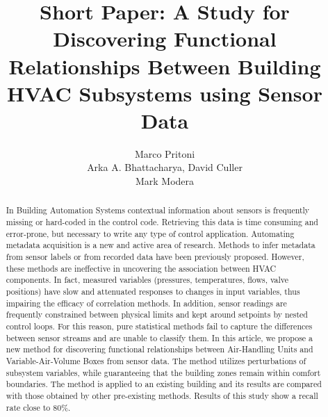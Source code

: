 \documentclass{sig-alternate-2013}
\author{
	Marco Pritoni\\
      \affaddr{UC Davis}
 \alignauthor
 Arka A. Bhattacharya, David Culler \\
 \affaddr{UC Berkeley} 
\alignauthor
  Mark Modera\\
 \affaddr{UC Davis}
}
\title{Short Paper: A Study for Discovering Functional Relationships Between Building HVAC Subsystems using Sensor Data}
\begin{document}
\maketitle

\begin{abstract}

In Building Automation Systems contextual information about sensors is frequently missing or hard-coded in the control code. Retrieving this data is time consuming and error-prone, but necessary to write any type of control application. Automating metadata acquisition is a new and active area of research. Methods to infer metadata from sensor labels or from recorded data have been previously proposed. However, these methods are ineffective in uncovering the association between HVAC components. In fact, measured variables (pressures, temperatures, flows, valve positions) have slow and attenuated responses to changes in input variables, thus impairing the efficacy of correlation methods. In addition, sensor readings are frequently constrained between physical limits and kept around setpoints by nested control loops. For this reason, pure statistical methods fail to capture the differences between sensor streams and are unable to classify them. In this article, we propose a new method for discovering functional relationships between Air-Handling Units and Variable-Air-Volume Boxes from sensor data. The method utilizes perturbations of subsystem variables, while guaranteeing that the building zones remain within comfort boundaries. The method is applied to an existing building and its results are compared with those obtained by other pre-existing methods. Results of this study show a recall rate close to 80\%.

\end{abstract}






%




%
%
%
%
%
%
%
%
%
%


\footnotesize
\end{document}
